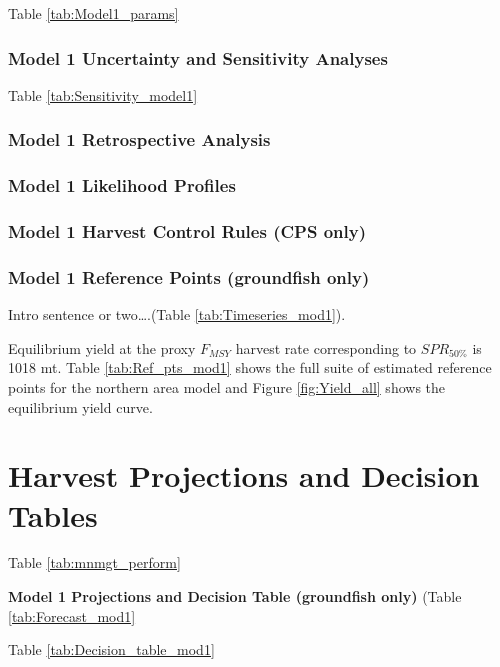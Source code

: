 \documentclass[12pt,]{article}
\begin{document}
Table \ref{tab:Model1_params}

\subsubsection{Model 1 Uncertainty and Sensitivity
Analyses}\label{model-1-uncertainty-and-sensitivity-analyses}

Table \ref{tab:Sensitivity_model1}

\subsubsection{Model 1 Retrospective
Analysis}\label{model-1-retrospective-analysis}

\subsubsection{Model 1 Likelihood
Profiles}\label{model-1-likelihood-profiles}

\subsubsection{Model 1 Harvest Control Rules (CPS
only)}\label{model-1-harvest-control-rules-cps-only}

\subsubsection{Model 1 Reference Points (groundfish
only)}\label{model-1-reference-points-groundfish-only}

Intro sentence or two\ldots{}.(Table \ref{tab:Timeseries_mod1}).

Equilibrium yield at the proxy \(F_{MSY}\) harvest rate corresponding to
\(SPR_{50\%}\) is 1018 mt. Table \ref{tab:Ref_pts_mod1} shows the full
suite of estimated reference points for the northern area model and
Figure \ref{fig:Yield_all} shows the equilibrium yield curve.

\section{Harvest Projections and Decision
Tables}\label{harvest-projections-and-decision-tables}

Table \ref{tab:mnmgt_perform}

\textbf{Model 1 Projections and Decision Table (groundfish only)} (Table
\ref{tab:Forecast_mod1}

Table \ref{tab:Decision_table_mod1}
\end{document}
